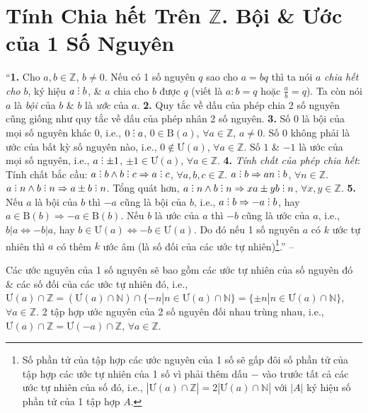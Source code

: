 \documentclass{article}
\numberwithin{equation}{section}
\DeclareRobustCommand{\divby}{%
	\mathrel{\vbox{\baselineskip.65ex\lineskiplimit0pt\hbox{.}\hbox{.}\hbox{.}}}%
}
\begin{document}
\section{Tính Chia hết Trên $\mathbb{Z}$. Bội \& Ước của 1 Số Nguyên}
``\textbf{1.} Cho $a,b\in\mathbb{Z}$, $b\ne0$. Nếu có 1 số nguyên $q$ sao cho $a = bq$ thì ta nói $a$ \textit{chia hết cho} $b$, ký hiệu $a\divby b$, \& $a$ chia cho $b$ được $q$ (viết là $a:b = q$ hoặc $\frac{a}{b} = q$). Ta còn nói $a$ là \textit{bội} của $b$ \& $b$ là \textit{ước} của $a$. \textbf{2.} Quy tắc về dấu của phép chia 2 số nguyên cũng giống như quy tắc về dấu của phép nhân 2 số nguyên. \textbf{3.} Số $0$ là bội của mọi số nguyên khác $0$, i.e., $0\divby a$, $0\in\mbox{B}(a)$, $\forall a\in\mathbb{Z}$, $a\ne0$. Số $0$ không phải là ước của bất kỳ số nguyên nào, i.e., $0\notin\mbox{Ư}(a)$, $\forall a\in\mathbb{Z}$. Số $1$ \& $-1$ là ước của mọi số nguyên, i.e., $a\divby\pm1$, $\pm1\in\mbox{Ư}(a)$, $\forall a\in\mathbb{Z}$. \textbf{4.} \textit{Tính chất của phép chia hết}: Tính chất bắc cầu: $a\divby b\land b\divby c\Rightarrow a\divby c$, $\forall a,b,c\in\mathbb{Z}$. $a\divby b\Rightarrow an\divby b$, $\forall n\in\mathbb{Z}$. $a\divby n\land b\divby n\Rightarrow a\pm b\divby n$. Tổng quát hơn, $a\divby n\land b\divby n\Rightarrow xa\pm yb\divby n$, $\forall x,y\in\mathbb{Z}$. \textbf{5.} Nếu $a$ là bội của $b$ thì $-a$ cũng là bội của $b$, i.e., $a\divby b\Rightarrow-a\divby b$, hay $a\in\mbox{B}(b)\Rightarrow-a\in\mbox{B}(b)$. Nếu $b$ là ước của $a$ thì $-b$ cũng là ước của $a$, i.e., $b|a\Leftrightarrow-b|a$, hay $b\in\mbox{Ư}(a)\Leftrightarrow-b\in\mbox{Ư}(a)$. Do đó nếu 1 số nguyên $a$ có $k$ ước tự nhiên thì $a$ có thêm $k$ ước âm (là số đối của các ước tự nhiên)\footnote{Số phần tử của tập hợp các ước nguyên của 1 số sẽ gấp đôi số phần tử của tập hợp các ước tự nhiên của 1 số vì phải thêm dấu $-$ vào trước tất cả các ước tự nhiên của số đó, i.e., $|\mbox{Ư}(a)\cap\mathbb{Z}| = 2|\mbox{Ư}(a)\cap\mathbb{N}|$ với $|A|$ ký hiệu số phần tử của 1 tập hợp $A$.}.'' -- \cite[Chap. II, \S5, p. 42]{Tuyen_Toan_6}

Các ước nguyên của 1 số nguyên sẽ bao gồm các ước tự nhiên của số nguyên đó \& các số đối của các ước tự nhiên đó, i.e., $\mbox{Ư}(a)\cap\mathbb{Z} = (\mbox{Ư}(a)\cap\mathbb{N})\cap\{-n|n\in\mbox{Ư}(a)\cap\mathbb{N}\} = \{\pm n|n\in\mbox{Ư}(a)\cap\mathbb{N}\}$, $\forall a\in\mathbb{Z}$. 2 tập hợp ước nguyên của 2 số nguyên đối nhau trùng nhau, i.e., $\mbox{Ư}(a)\cap\mathbb{Z} = \mbox{Ư}(-a)\cap\mathbb{Z}$, $\forall a\in\mathbb{Z}$.
\end{document}
